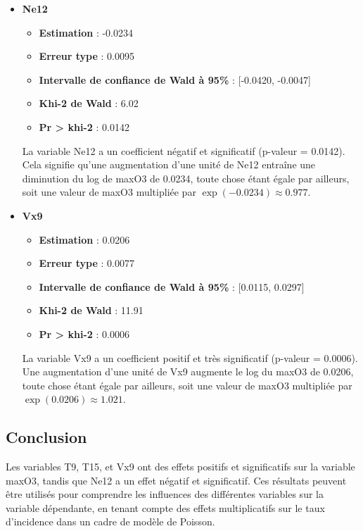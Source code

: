 \documentclass[12pt,a4paper]{article}
\begin{document}
\begin{itemize}
	\item \textbf{Ne12}
	\begin{itemize}
		\item \textbf{Estimation} : -0.0234
		\item \textbf{Erreur type} : 0.0095
		\item \textbf{Intervalle de confiance de Wald à 95\%} : [-0.0420, -0.0047]
		\item \textbf{Khi-2 de Wald} : 6.02
		\item \textbf{Pr > khi-2} : 0.0142
	\end{itemize}
	La variable Ne12 a un coefficient négatif et significatif (p-valeur = 0.0142). Cela signifie qu'une augmentation d'une unité de Ne12 entraîne une diminution du log de maxO3 de 0.0234, toute chose étant égale par ailleurs, soit une valeur de maxO3 multipliée par $\exp(-0.0234) \approx 0.977$.
	
	\item \textbf{Vx9}
	\begin{itemize}
		\item \textbf{Estimation} : 0.0206
		\item \textbf{Erreur type} : 0.0077
		\item \textbf{Intervalle de confiance de Wald à 95\%} : [0.0115, 0.0297]
		\item \textbf{Khi-2 de Wald} : 11.91
		\item \textbf{Pr > khi-2} : 0.0006
	\end{itemize}
	La variable Vx9 a un coefficient positif et très significatif (p-valeur = 0.0006). Une augmentation d'une unité de Vx9 augmente le log du maxO3 de 0.0206, toute chose étant égale par ailleurs, soit une valeur de maxO3 multipliée par $\exp(0.0206) \approx 1.021$.
\end{itemize}

\subsection{Conclusion}
Les variables T9, T15, et Vx9 ont des effets positifs et significatifs sur la variable maxO3, tandis que Ne12 a un effet négatif et significatif. Ces résultats peuvent être utilisés pour comprendre les influences des différentes variables sur la variable dépendante, en tenant compte des effets multiplicatifs sur le taux d'incidence dans un cadre de modèle de Poisson.
\end{document}
